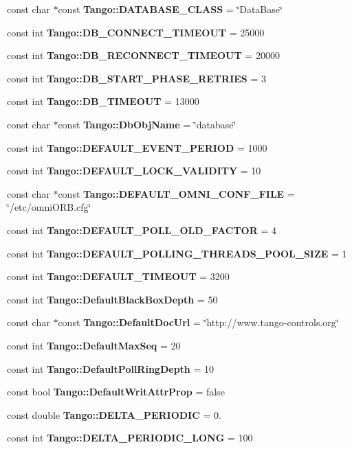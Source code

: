\begin{DoxyCompactItemize}
\item 
const char $\ast$const {\bf Tango\-::\-D\-A\-T\-A\-B\-A\-S\-E\-\_\-\-C\-L\-A\-S\-S} = \char`\"{}Data\-Base\char`\"{}
\item 
const int {\bf Tango\-::\-D\-B\-\_\-\-C\-O\-N\-N\-E\-C\-T\-\_\-\-T\-I\-M\-E\-O\-U\-T} = 25000
\item 
const int {\bf Tango\-::\-D\-B\-\_\-\-R\-E\-C\-O\-N\-N\-E\-C\-T\-\_\-\-T\-I\-M\-E\-O\-U\-T} = 20000
\item 
const int {\bf Tango\-::\-D\-B\-\_\-\-S\-T\-A\-R\-T\-\_\-\-P\-H\-A\-S\-E\-\_\-\-R\-E\-T\-R\-I\-E\-S} = 3
\item 
const int {\bf Tango\-::\-D\-B\-\_\-\-T\-I\-M\-E\-O\-U\-T} = 13000
\item 
const char $\ast$const {\bf Tango\-::\-Db\-Obj\-Name} = \char`\"{}database\char`\"{}
\item 
const int {\bf Tango\-::\-D\-E\-F\-A\-U\-L\-T\-\_\-\-E\-V\-E\-N\-T\-\_\-\-P\-E\-R\-I\-O\-D} = 1000
\item 
const int {\bf Tango\-::\-D\-E\-F\-A\-U\-L\-T\-\_\-\-L\-O\-C\-K\-\_\-\-V\-A\-L\-I\-D\-I\-T\-Y} = 10
\item 
const char $\ast$const {\bf Tango\-::\-D\-E\-F\-A\-U\-L\-T\-\_\-\-O\-M\-N\-I\-\_\-\-C\-O\-N\-F\-\_\-\-F\-I\-L\-E} = \char`\"{}/etc/omni\-O\-R\-B.\-cfg\char`\"{}
\item 
const int {\bf Tango\-::\-D\-E\-F\-A\-U\-L\-T\-\_\-\-P\-O\-L\-L\-\_\-\-O\-L\-D\-\_\-\-F\-A\-C\-T\-O\-R} = 4
\item 
const int {\bf Tango\-::\-D\-E\-F\-A\-U\-L\-T\-\_\-\-P\-O\-L\-L\-I\-N\-G\-\_\-\-T\-H\-R\-E\-A\-D\-S\-\_\-\-P\-O\-O\-L\-\_\-\-S\-I\-Z\-E} = 1
\item 
const int {\bf Tango\-::\-D\-E\-F\-A\-U\-L\-T\-\_\-\-T\-I\-M\-E\-O\-U\-T} = 3200
\item 
const int {\bf Tango\-::\-Default\-Black\-Box\-Depth} = 50
\item 
const char $\ast$const {\bf Tango\-::\-Default\-Doc\-Url} = \char`\"{}http\-://www.\-tango-\/controls.\-org\char`\"{}
\item 
const int {\bf Tango\-::\-Default\-Max\-Seq} = 20
\item 
const int {\bf Tango\-::\-Default\-Poll\-Ring\-Depth} = 10
\item 
const bool {\bf Tango\-::\-Default\-Writ\-Attr\-Prop} = false
\item 
const double {\bf Tango\-::\-D\-E\-L\-T\-A\-\_\-\-P\-E\-R\-I\-O\-D\-I\-C} = 0.
\item 
const int {\bf Tango\-::\-D\-E\-L\-T\-A\-\_\-\-P\-E\-R\-I\-O\-D\-I\-C\-\_\-\-L\-O\-N\-G} = 100

\end{DoxyCompactItemize}
